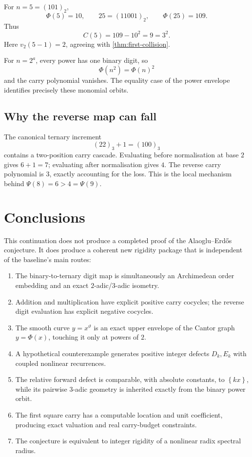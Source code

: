 \documentclass[11pt]{article}
\theoremstyle{definition}
\theoremstyle{remark}
\newcommand{\fracpart}[1]{\left\{#1\right\}}
\newcommand{\vTwo}{v_2}
\newcommand{\PhiMap}{\Phi}
\newcommand{\PsiMap}{\Psi}
\newcommand{\thetaAE}{\vartheta}
\begin{document}
For $n=5=(101)_2$,
\[
 \PhiMap(5)=10,
 \qquad 25=(11001)_2,
 \qquad \PhiMap(25)=109.
\]
Thus
\[
 C(5)=109-10^2=9=3^2.
\]
Here $\vTwo(5-1)=2$, agreeing with \cref{thm:first-collision}.

For $n=2^a$, every power has one binary digit, so
\[
 \PhiMap(n^2)=\PhiMap(n)^2
\]
and the carry polynomial vanishes.  The equality case of the power envelope
identifies precisely these monomial orbits.

\subsection{Why the reverse map can fall}

The canonical ternary increment
\[
 (22)_3+1=(100)_3
\]
contains a two-position carry cascade.  Evaluating before normalisation at
base $2$ gives $6+1=7$; evaluating after normalisation gives $4$.  The reverse
carry polynomial is $3$, exactly accounting for the loss.  This is the local
mechanism behind $\PsiMap(8)=6>4=\PsiMap(9)$.

\section{Conclusions}

This continuation does not produce a completed proof of the
Alaoglu--Erd\H{o}s conjecture.  It does produce a coherent new rigidity package
that is independent of the baseline's main routes:

\begin{enumerate}
\item The binary-to-ternary digit map is simultaneously an Archimedean order
embedding and an exact $2$-adic/$3$-adic isometry.
\item Addition and multiplication have explicit positive carry cocycles; the
reverse digit evaluation has explicit negative cocycles.
\item The smooth curve $y=x^{\thetaAE}$ is an exact upper envelope of the
Cantor graph $y=\PhiMap(x)$, touching it only at powers of $2$.
\item A hypothetical counterexample generates positive integer defects
$D_k,E_k$ with coupled nonlinear recurrences.
\item The relative forward defect is comparable, with absolute constants, to
$\fracpart{kx}$, while its pairwise $3$-adic geometry is inherited exactly
from the binary power orbit.
\item The first square carry has a computable location and unit coefficient,
producing exact valuation and real carry-budget constraints.
\item The conjecture is equivalent to integer rigidity of a nonlinear radix
spectral radius.
\end{enumerate}
\end{document}
